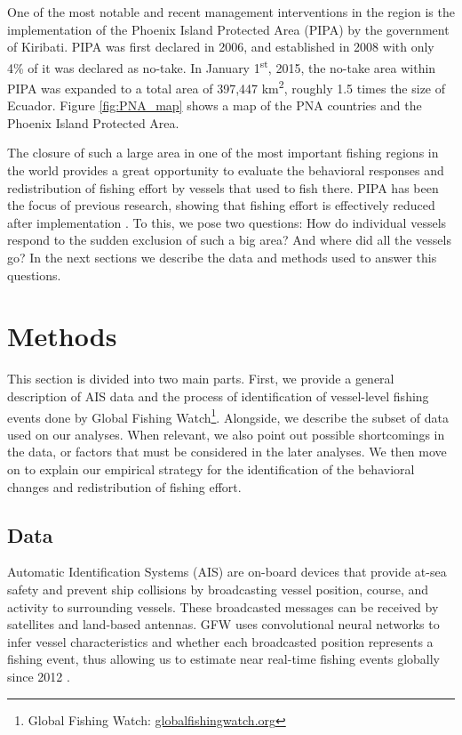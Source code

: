 \documentclass[11pt,]{article}
\let\rmarkdownfootnote\footnote%
\def\footnote{\protect\rmarkdownfootnote}
\begin{document}
One of the most notable and recent management interventions in the
region is the implementation of the Phoenix Island Protected Area (PIPA)
by the government of Kiribati. PIPA was first declared in 2006, and
established in 2008 with only 4\% of it was declared as no-take. In
January 1\textsuperscript{st}, 2015, the no-take area within PIPA was
expanded to a total area of 397,447 km\textsuperscript{2}, roughly 1.5
times the size of Ecuador. Figure \ref{fig:PNA_map} shows a map of the
PNA countries and the Phoenix Island Protected Area.

The closure of such a large area in one of the most important fishing
regions in the world provides a great opportunity to evaluate the
behavioral responses and redistribution of fishing effort by vessels
that used to fish there. PIPA has been the focus of previous research,
showing that fishing effort is effectively reduced after implementation
\citep{mccauley_2016,mcdermott_2018}. To this, we pose two questions:
How do individual vessels respond to the sudden exclusion of such a big
area? And where did all the vessels go? In the next sections we describe
the data and methods used to answer this questions.

\hypertarget{methods}{%
\section{Methods}\label{methods}}

This section is divided into two main parts. First, we provide a general
description of AIS data and the process of identification of
vessel-level fishing events done by Global Fishing Watch\footnote{Global
  Fishing Watch: \url{globalfishingwatch.org}}. Alongside, we describe
the subset of data used on our analyses. When relevant, we also point
out possible shortcomings in the data, or factors that must be
considered in the later analyses. We then move on to explain our
empirical strategy for the identification of the behavioral changes and
redistribution of fishing effort.

\hypertarget{data}{%
\subsection{Data}\label{data}}

Automatic Identification Systems (AIS) are on-board devices that provide
at-sea safety and prevent ship collisions by broadcasting vessel
position, course, and activity to surrounding vessels. These broadcasted
messages can be received by satellites and land-based antennas. GFW uses
convolutional neural networks to infer vessel characteristics and
whether each broadcasted position represents a fishing event, thus
allowing us to estimate near real-time fishing events globally since
2012 \citep{kroodsma_2018}.
\end{document}
